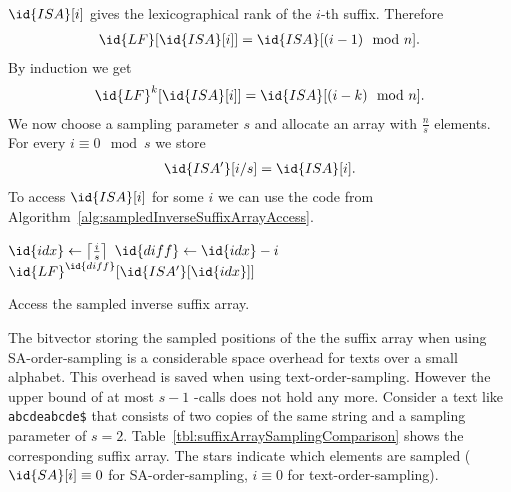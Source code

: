 \begin{Proof}
  $\id{ISA}[i]$ gives the lexicographical rank of the $i$-th suffix. Therefore
  \begin{align}
    \id{LF}[\id{ISA}[i]] = \id{ISA}[(i-1) \mod n]
    \text{.}
  \end{align}
  By induction we get
  \begin{align}
    \id{LF}^k[\id{ISA}[i]] = \id{ISA}[(i - k) \mod n]
    \text{.}
  \end{align}
  We now choose a sampling parameter $s$ and allocate an array  with $\frac{n}{s}$ elements. For every $i \equiv 0 \mod s$ we store
  \begin{align}
    \id{ISA'}[i/s] = \id{ISA}[i]
    \text{.}
  \end{align}
  To access $\id{ISA}[i]$ for some $i$ we can use the code from Algorithm~\ref{alg:sampledInverseSuffixArrayAccess}.
  \begin{algorithm}[htb]
    \begin{codebox}
      \li $\id{idx} \gets \left \lceil \frac{i}{s} \right \rceil$
      \li $\id{diff} \gets \id{idx} - i$
      \li \Return $\id{LF}^{\id{diff}}[\id{ISA'}[\id{idx}]]$
    \end{codebox}
    \caption{Access the sampled inverse suffix array.}
    \label{alg:sampledInverseSuffixArrayAccess}
  \end{algorithm}
\end{Proof}

The bitvector storing the sampled positions of the the suffix array when using SA-order-sampling is a considerable space overhead for texts over a small alphabet. This overhead is saved when using text-order-sampling. However the upper bound of at most $s-1$ -calls does not hold any more. Consider a text like \texttt{abcdeabcde\$} that consists of two copies of the same string and a sampling parameter of $s=2$. Table~\ref{tbl:suffixArraySamplingComparison} shows the corresponding suffix array. The stars indicate which elements are sampled ($\id{SA}[i] \equiv 0$ for SA-order-sampling, $i \equiv 0$ for text-order-sampling).

